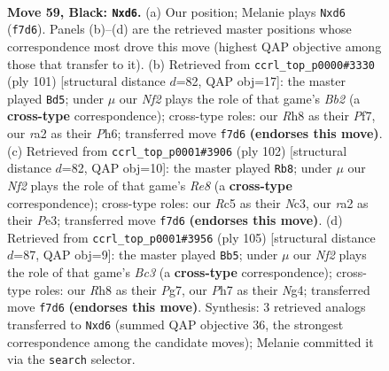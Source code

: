 \documentclass[11pt]{article}
\begin{document}
\clearpage

\begin{figure}[p]\centering
\begin{subfigure}{0.46\textwidth}\centering
\resizebox{\linewidth}{!}{%
\newchessgame
\chessboard[
  setfen={7r/p4nkp/P2B4/2r5/2B5/1Pp1R1KP/R1P3P1/8 b - - 0 59},
  showmover=false,
  pgfstyle=straightmove, color=movearrow, markmove={f7-d6}
]}
\caption{}
\end{subfigure}\hfill
\begin{subfigure}{0.46\textwidth}\centering
\resizebox{\linewidth}{!}{%
\newchessgame
\chessboard[
  setfen={8/1b3pk1/6pp/2r1P3/R4P2/2p1P1KP/1rB3P1/2R5 b - - 37 51},
  showmover=false,
  pgfstyle=straightmove, color=movearrow, markmove={b7-d5}
]}
\caption{}
\end{subfigure}
\\[4pt]
\begin{subfigure}{0.46\textwidth}\centering
\resizebox{\linewidth}{!}{%
\newchessgame
\chessboard[
  setfen={4R3/3k1r1p/2p3p1/3b4/4p1PP/2N1P1K1/5P2/8 w - - 7 52},
  showmover=false,
  pgfstyle=straightmove, color=movearrow, markmove={e8-b8}
]}
\caption{}
\end{subfigure}\hfill
\begin{subfigure}{0.46\textwidth}\centering
\resizebox{\linewidth}{!}{%
\newchessgame
\chessboard[
  setfen={8/5ppk/2b1p3/4P2p/3R1PnP/2B3PK/1P4B1/2r5 b - - 2 53},
  showmover=false,
  pgfstyle=straightmove, color=movearrow, markmove={c6-b5}
]}
\caption{}
\end{subfigure}
\caption{\textbf{Move 59, Black: \texttt{Nxd6}.} (a) Our position; Melanie plays \texttt{Nxd6} (\texttt{f7d6}). Panels (b)--(d) are the retrieved master positions whose correspondence most drove this move (highest QAP objective among those that transfer to it). (b) Retrieved from \texttt{ccrl\_top\_p0000\#3330} (ply 101) [structural distance $d$=82, QAP obj=17]: the master played \texttt{Bd5}; under $\mu$ our \emph{Nf2} plays the role of that game's \emph{Bb2} (a \textbf{cross-type} correspondence); cross-type roles: our \emph{R}h8 as their \emph{P}f7, our \emph{r}a2 as their \emph{P}h6; transferred move \texttt{f7d6} \textbf{(endorses this move)}. (c) Retrieved from \texttt{ccrl\_top\_p0001\#3906} (ply 102) [structural distance $d$=82, QAP obj=10]: the master played \texttt{Rb8}; under $\mu$ our \emph{Nf2} plays the role of that game's \emph{Re8} (a \textbf{cross-type} correspondence); cross-type roles: our \emph{R}c5 as their \emph{N}c3, our \emph{r}a2 as their \emph{P}e3; transferred move \texttt{f7d6} \textbf{(endorses this move)}. (d) Retrieved from \texttt{ccrl\_top\_p0001\#3956} (ply 105) [structural distance $d$=87, QAP obj=9]: the master played \texttt{Bb5}; under $\mu$ our \emph{Nf2} plays the role of that game's \emph{Bc3} (a \textbf{cross-type} correspondence); cross-type roles: our \emph{R}h8 as their \emph{P}g7, our \emph{P}h7 as their \emph{N}g4; transferred move \texttt{f7d6} \textbf{(endorses this move)}. Synthesis: 3 retrieved analogs transferred to \texttt{Nxd6} (summed QAP objective 36, the strongest correspondence among the candidate moves); Melanie committed it via the \texttt{search} selector.}
\label{fig:thought-m117}
\end{figure}
\end{document}
